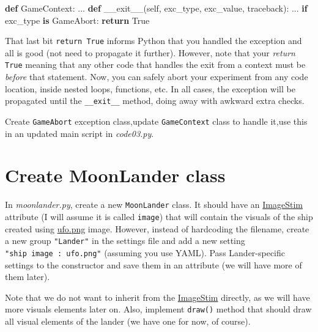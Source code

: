 \documentclass[
]{book}
\newenvironment{Shaded}{\begin{snugshade}}{\end{snugshade}}
\newcommand{\ControlFlowTok}[1]{\textcolor[rgb]{0.13,0.29,0.53}{\textbf{#1}}}
\newcommand{\FunctionTok}[1]{\textcolor[rgb]{0.00,0.00,0.00}{#1}}
\newcommand{\KeywordTok}[1]{\textcolor[rgb]{0.13,0.29,0.53}{\textbf{#1}}}
\newcommand{\NormalTok}[1]{#1}
\newcommand{\VariableTok}[1]{\textcolor[rgb]{0.00,0.00,0.00}{#1}}
\begin{document}
\begin{Shaded}
\begin{Highlighting}[]
\KeywordTok{def}\NormalTok{ GameContext:}
\NormalTok{    ...}
    \KeywordTok{def} \FunctionTok{\_\_exit\_\_}\NormalTok{(}\VariableTok{self}\NormalTok{, exc\_type, exc\_value, traceback):}
\NormalTok{        ...}
        \ControlFlowTok{if}\NormalTok{ exc\_type }\KeywordTok{is}\NormalTok{ GameAbort:}
            \ControlFlowTok{return} \VariableTok{True}
  
\end{Highlighting}
\end{Shaded}

That last bit \texttt{return\ True} informs Python that you handled the exception and all is good (not need to propagate it further). However, note that your \emph{return} \texttt{True} meaning that any other code that handles the exit from a context must be \emph{before} that statement. Now, you can safely abort your experiment from any code location, inside nested loops, functions, etc. In all cases, the exception will be propagated until the \texttt{\_\_exit\_\_} method, doing away with awkward extra checks.

Create \texttt{GameAbort} exception class,update \texttt{GameContext} class to handle it,use this in an updated main script in \emph{code03.py}.

\hypertarget{create-moonlander-class}{%
\section{Create MoonLander class}\label{create-moonlander-class}}

In \emph{moonlander.py}, create a new \texttt{MoonLander} class. It should have an \href{https://psychopy.org/api/visual/imagestim.html}{ImageStim} attribute (I will assume it is called \texttt{image}) that will contain the visuals of the ship created using \href{material/ufo.png}{ufo.png} image. However, instead of hardcoding the filename, create a new group \texttt{"Lander"} in the settings file and add a new setting \texttt{"ship\ image\ :\ ufo.png"} (assuming you use YAML). Pass Lander-specific settings to the constructor and save them in an attribute (we will have more of them later).

Note that we do not want to inherit from the \href{https://psychopy.org/api/visual/imagestim.html}{ImageStim} directly, as we will have more visuals elements later on. Also, implement \texttt{draw()} method that should draw all visual elements of the lander (we have one for now, of course).
\end{document}
